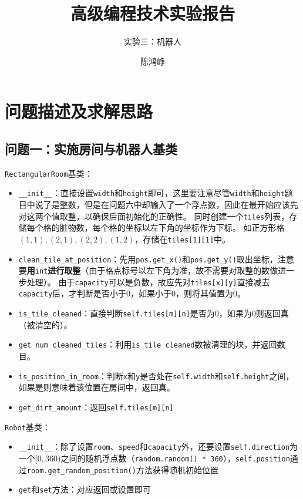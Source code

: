 \documentclass[logo,reportComp]{thesis}
\title{高级编程技术实验报告}
\subtitle{实验三：机器人}
\author{陈鸿峥}
\begin{document}
\maketitle

\section{问题描述及求解思路}
\subsection{问题一：实施房间与机器人基类}
\verb'RectangularRoom'基类：
\begin{itemize}
    \item \verb'__init__'：直接设置\verb'width'和\verb'height'即可，这里要注意尽管\verb'width'和\verb'height'题目中说了是整数，但是在问题六中却输入了一个浮点数，因此在最开始应该先对这两个值取整，以确保后面初始化的正确性。
    同时创建一个\verb'tiles'列表，存储每个格的脏物数，每个格的坐标以左下角的坐标作为下标。
    如正方形格$(1,1),(2,1),(2,2),(1,2)$，存储在\verb'tiles[1][1]'中。
    \item \verb'clean_tile_at_position'：先用\verb'pos.get_x()'和\verb'pos.get_y()'取出坐标，注意要\textbf{用}\verb'int'\textbf{进行取整}（由于格点标号以左下角为准，故不需要对取整的数做进一步处理）。
    由于\verb'capacity'可以是负数，故应先对\verb'tiles[x][y]'直接减去\verb'capacity'后，才判断是否小于$0$，如果小于$0$，则将其值置为$0$。
    \item \verb'is_tile_cleaned'：直接判断\verb'self.tiles[m][n]'是否为$0$，如果为$0$则返回真（被清空的）。
    \item \verb'get_num_cleaned_tiles'：利用\verb'is_tile_cleaned'数被清理的块，并返回数目。
    \item \verb'is_position_in_room'：判断\verb'x'和\verb'y'是否处在\verb'self.width'和\verb'self.height'之间，如果是则意味着该位置在房间中，返回真。
    \item \verb'get_dirt_amount'：返回\verb'self.tiles[m][n]'
\end{itemize}

\verb'Robot'基类：
\begin{itemize}
    \item \verb'__init__'：除了设置\verb'room'、\verb'speed'和\verb'capacity'外，还要设置\verb'self.direction'为一个$[0,360)$之间的随机浮点数（\verb'random.random() * 360'），\verb'self.position'通过\verb'room.get_random_position()'方法获得随机初始位置
    \item \verb'get'和\verb'set'方法：对应返回或设置即可
\end{itemize}
\end{document}
